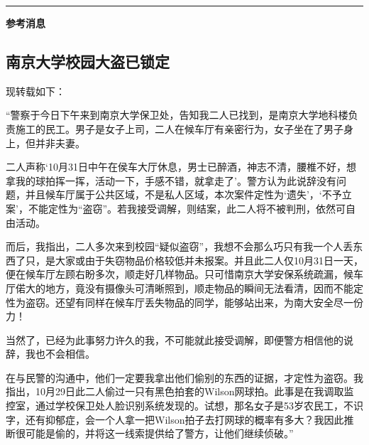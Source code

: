 \documentclass[letterpaper, 12pt]{article}
\begin{document}
\hrule
\vspace{4mm}
\centerline{\huge\textbf{参考消息}}
\begin{multicols}{2}
\section{南京大学校园大盗已锁定}
现转载如下：

“警察于今日下午来到南京大学保卫处，告知我二人已找到，是南京大学地科楼负责施工的民工。男子是女子上司，二人在候车厅有亲密行为，女子坐在了男子身上，但并非夫妻。

二人声称‘10月31日中午在侯车大厅休息，男士已醉酒，神志不清，腰椎不好，想拿我的球拍挥一挥，活动一下，手感不错，就拿走了’。警方认为此说辞没有问题，并且候车厅属于公共区域，不是私人区域，本次案件定性为‘遗失’，‘不予立案’，不能定性为“盗窃”。若我接受调解，则结案，此二人将不被判刑，依然可自由活动。

而后，我指出，二人多次来到校园“疑似盗窃”，我想不会那么巧只有我一个人丢东西了只，是大家或由于失窃物品价格较低并未报案。并且此二人仅10月31日一天，便在候车厅左顾右盼多次，顺走好几样物品。只可惜南京大学安保系统疏漏，候车厅偌大的地方，竟没有摄像头可清晰照到，顺走物品的瞬间无法看清，因而不能定性为盗窃。还望有同样在候车厅丢失物品的同学，能够站出来，为南大安全尽一份力！

当然了，已经为此事努力许久的我，不可能就此接受调解，即便警方相信他的说辞，我也不会相信。

在与民警的沟通中，他们一定要我拿出他们偷别的东西的证据，才定性为盗窃。我指出，10月29日此二人偷过一只有黑色拍套的Wilson网球拍。此事是在我调取监控室，通过学校保卫处人脸识别系统发现的。试想，那名女子是53岁农民工，不识字，还有抑郁症，会一个人拿一把Wilson拍子去打网球的概率有多大？我因此推断很可能是偷的，并将这一线索提供给了警方，让他们继续侦破。”
\end{multicols} 
\end{document}
